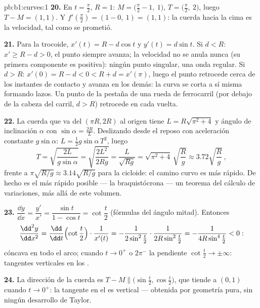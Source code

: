 \begin{solution}{pb:b1:curves:1}
\textbf{20.} En $t = \frac\pi2$, $R = 1$: $M = \bigl(\frac\pi2 -
1,\ 1\bigr)$, $T = \bigl(\frac\pi2,\ 2\bigr)$, luego $T - M = (1,
1)$. Y $f'(\frac\pi2) = (1 - 0,\ 1) = (1, 1)$: la cuerda hacia
la cima es la velocidad, tal como se prometió.

\textbf{21.} Para la trocoide, $x'(t) = R - d\cos t$ y $y'(t)
= d\sin t$. Si $d < R$: $x' \geq R - d > 0$, el punto siempre
avanza; la velocidad no se anula nunca (su primera componente es
positiva): ningún punto singular, una onda regular. Si $d > R$: $x'(0)
= R - d < 0 < R + d = x'(\pi)$, luego el punto retrocede
cerca de los instantes de contacto y avanza en los demás: la curva
se corta a sí misma formando lazos. Un punto de la pestaña de una rueda
de ferrocarril (por debajo de la cabeza del carril, $d > R$) retrocede en cada
vuelta.

\textbf{22.} La cuerda que va del  $(\pi R, 2R)$ al origen
tiene  $L = R\sqrt{\pi^2 + 4}$ y ángulo de inclinación $\alpha$ con
$\sin\alpha = \frac{2R}{L}$. Deslizando desde el reposo con aceleración
constante $g\sin\alpha$: $L = \frac12 g\sin\alpha\,T^2$, luego
\[
T = \sqrt{\frac{2L}{g\sin\alpha}} = \sqrt{\frac{2L^2}{2Rg}}
= \frac{L}{\sqrt{Rg}} = \sqrt{\pi^2 + 4}\,\sqrt{\frac Rg}
\approx 3.72\sqrt{\frac Rg}\,,
\]
frente a $\pi\sqrt{R/g} \approx 3.14\sqrt{R/g}$ para la cicloide:
el camino curvo es más rápido. De hecho es el más rápido posible
--- la braquistócrona --- un teorema del cálculo de
variaciones, más allá de este volumen.

\textbf{23.} $\dfrac{\dd y}{\dd x} = \dfrac{y'}{x'} =
\dfrac{\sin t}{1 - \cos t} = \cot\dfrac t2$ (fórmulas del ángulo
mitad). Entonces
\[
\frac{\dd^2y}{\dd x^2}
= \frac{\dd}{\dd t}\Bigl(\cot\frac t2\Bigr)\cdot\frac{1}{x'(t)}
= -\frac{1}{2\sin^2\frac t2}\cdot\frac{1}{2R\sin^2\frac t2}
= -\frac{1}{4R\sin^4\frac t2} < 0 :
\]
cóncava en todo el arco; cuando $t \to 0^+$ o $2\pi^-$ la
pendiente $\cot\frac t2 \to \pm\infty$: tangentes verticales en los
.

\textbf{24.} La dirección de la cuerda es $T - M \parallel
\bigl(\sin\frac t2, \cos\frac t2\bigr)$, que tiende a $(0, 1)$
cuando $t \to 0^{+}$: la tangente en el  es vertical ---
obtenida por geometría pura, sin ningún desarrollo de Taylor.


\end{solution}
